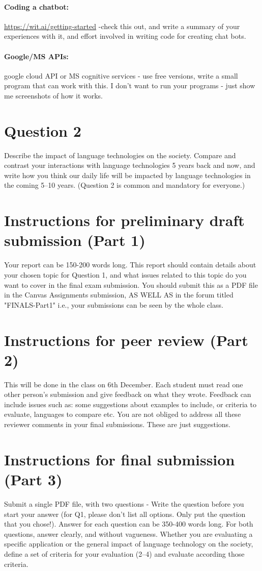 \documentclass[11pt,a4paper]{article}
\begin{document}
\paragraph{Coding a chatbot: } \url{https://wit.ai/getting-started} -check this out, and write a summary of your experiences with it, and effort involved in writing code for creating chat bots.

\paragraph{Google/MS APIs: } google cloud API or MS cognitive services - use free versions, write a small program that can work with this. I don't want to run your programs - just show me screenshots of how it works. 

\section{Question 2}
Describe the impact of language technologies on the society. Compare and contrast your interactions with language technologies 5 years back and now, and write how you think our daily life will be impacted by language technologies in the coming 5--10 years. 
(Question 2 is common and mandatory for everyone.)

\section{Instructions for preliminary draft submission (Part 1)}
Your report can be 150-200 words long. This report should contain details about your chosen topic for Question 1, and what issues related to this topic do you want to cover in the final exam submission. You should submit this as a PDF file in the Canvas Assignments submission, AS WELL AS in the forum titled "FINALS-Part1" i.e., your submissions can be seen by the whole class.

\section{Instructions for peer review (Part 2)}
This will be done in the class on 6th December. Each student must read one other person's submission and give feedback on what they wrote.  Feedback can include issues such as: some suggestions about examples to include, or criteria to evaluate, languages to compare etc. You are not obliged to address all these reviewer comments in your final submissions. These are just suggestions.

\section{Instructions for final submission (Part 3)}
Submit a single PDF file, with two questions - Write the question before you start your answer (for Q1, please don't list all options. Only put the question that you chose!). Answer for each question can be 350-400 words long. For both questions, answer clearly, and without vagueness. Whether you are evaluating a specific application or the general impact of language technology on the society, define a set of criteria for your evaluation (2--4) and evaluate according those criteria.  
\end{document}
